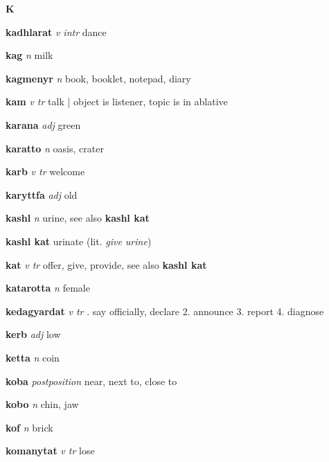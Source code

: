 \begin{center} \Huge \bfseries K \end{center}\textbf{kadhlarat}   \emph{v intr} \textperiodcentered dance

\textbf{kag}   \emph{n} \textperiodcentered milk

\textbf{kagmenyr}   \emph{n} \textperiodcentered book, booklet, notepad, diary

\textbf{kam}   \emph{v tr} \textperiodcentered talk | object is listener, topic is in ablative

\textbf{karana}   \emph{adj} \textperiodcentered green

\textbf{karatto}   \emph{n} \textperiodcentered oasis, crater

\textbf{karb}   \emph{v tr} \textperiodcentered welcome

\textbf{karyttfa}   \emph{adj} \textperiodcentered old

\textbf{kashl}   \emph{n} \textperiodcentered urine, see also \textbf{kashl kat}

\textbf{kashl kat}    \textperiodcentered urinate (lit. \emph{give urine})

\textbf{kat}   \emph{v tr} \textperiodcentered offer, give, provide, see also \textbf{kashl kat}

\textbf{katarotta}   \emph{n} \textperiodcentered female

\textbf{kedagyardat}   \emph{v tr} . say officially, declare 2. announce 3. report 4. diagnose 

\textbf{kerb}   \emph{adj} \textperiodcentered low

\textbf{ketta}   \emph{n} \textperiodcentered coin

\textbf{koba}   \emph{postposition} \textperiodcentered near, next to, close to

\textbf{kobo}   \emph{n} \textperiodcentered chin, jaw

\textbf{kof}   \emph{n} \textperiodcentered brick

\textbf{komanytat}   \emph{v tr} \textperiodcentered lose

